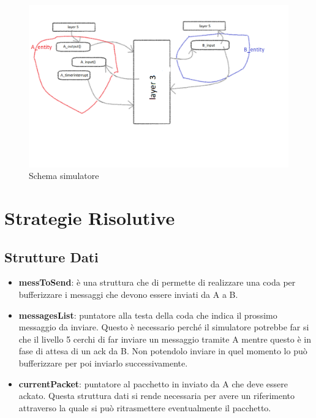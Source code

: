 \documentclass[a4paper]{article}
\begin{document}
\begin{figure}[h!]
\includegraphics[scale = 0.60]{Immagine.png}
\caption{Schema simulatore}
\end{figure}
\section{Strategie Risolutive}

\subsection{Strutture Dati}
\begin{itemize}
\item \textbf{messToSend}: è una struttura che di permette di realizzare una coda per 			bufferizzare i messaggi che devono essere inviati da A a B. 

\item \textbf{messagesList}: puntatore alla testa della coda che indica il prossimo 			messaggio da inviare. Questo è necessario perché il simulatore potrebbe far si che il livello 5 cerchi di far inviare un messaggio tramite A mentre questo è in fase di attesa di un ack da B. Non potendolo inviare in quel momento lo può bufferizzare per poi inviarlo successivamente.

\item \textbf{currentPacket}: puntatore al pacchetto in inviato da A che deve essere ackato. Questa struttura dati si rende necessaria per avere un riferimento attraverso la quale si può ritrasmettere eventualmente il pacchetto.
\end{itemize}
\end{document}
